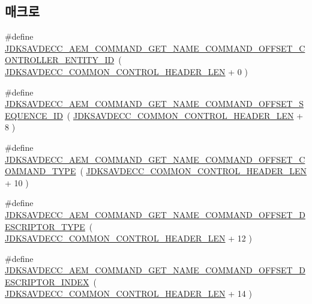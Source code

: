 \subsection*{매크로}
\begin{DoxyCompactItemize}
\item 
\#define \hyperlink{group__command__get__name_gaa35d50e1bea499d01a942ef2d31da293}{J\+D\+K\+S\+A\+V\+D\+E\+C\+C\+\_\+\+A\+E\+M\+\_\+\+C\+O\+M\+M\+A\+N\+D\+\_\+\+G\+E\+T\+\_\+\+N\+A\+M\+E\+\_\+\+C\+O\+M\+M\+A\+N\+D\+\_\+\+O\+F\+F\+S\+E\+T\+\_\+\+C\+O\+N\+T\+R\+O\+L\+L\+E\+R\+\_\+\+E\+N\+T\+I\+T\+Y\+\_\+\+ID}~( \hyperlink{group__jdksavdecc__avtp__common__control__header_gaae84052886fb1bb42f3bc5f85b741dff}{J\+D\+K\+S\+A\+V\+D\+E\+C\+C\+\_\+\+C\+O\+M\+M\+O\+N\+\_\+\+C\+O\+N\+T\+R\+O\+L\+\_\+\+H\+E\+A\+D\+E\+R\+\_\+\+L\+EN} + 0 )
\item 
\#define \hyperlink{group__command__get__name_ga0863e2410243183cd5b2e983cdcec90a}{J\+D\+K\+S\+A\+V\+D\+E\+C\+C\+\_\+\+A\+E\+M\+\_\+\+C\+O\+M\+M\+A\+N\+D\+\_\+\+G\+E\+T\+\_\+\+N\+A\+M\+E\+\_\+\+C\+O\+M\+M\+A\+N\+D\+\_\+\+O\+F\+F\+S\+E\+T\+\_\+\+S\+E\+Q\+U\+E\+N\+C\+E\+\_\+\+ID}~( \hyperlink{group__jdksavdecc__avtp__common__control__header_gaae84052886fb1bb42f3bc5f85b741dff}{J\+D\+K\+S\+A\+V\+D\+E\+C\+C\+\_\+\+C\+O\+M\+M\+O\+N\+\_\+\+C\+O\+N\+T\+R\+O\+L\+\_\+\+H\+E\+A\+D\+E\+R\+\_\+\+L\+EN} + 8 )
\item 
\#define \hyperlink{group__command__get__name_gae4df55f0f2311b271a730a3893196a86}{J\+D\+K\+S\+A\+V\+D\+E\+C\+C\+\_\+\+A\+E\+M\+\_\+\+C\+O\+M\+M\+A\+N\+D\+\_\+\+G\+E\+T\+\_\+\+N\+A\+M\+E\+\_\+\+C\+O\+M\+M\+A\+N\+D\+\_\+\+O\+F\+F\+S\+E\+T\+\_\+\+C\+O\+M\+M\+A\+N\+D\+\_\+\+T\+Y\+PE}~( \hyperlink{group__jdksavdecc__avtp__common__control__header_gaae84052886fb1bb42f3bc5f85b741dff}{J\+D\+K\+S\+A\+V\+D\+E\+C\+C\+\_\+\+C\+O\+M\+M\+O\+N\+\_\+\+C\+O\+N\+T\+R\+O\+L\+\_\+\+H\+E\+A\+D\+E\+R\+\_\+\+L\+EN} + 10 )
\item 
\#define \hyperlink{group__command__get__name_ga712329e89d6b6ca6b96759b6f9bf434b}{J\+D\+K\+S\+A\+V\+D\+E\+C\+C\+\_\+\+A\+E\+M\+\_\+\+C\+O\+M\+M\+A\+N\+D\+\_\+\+G\+E\+T\+\_\+\+N\+A\+M\+E\+\_\+\+C\+O\+M\+M\+A\+N\+D\+\_\+\+O\+F\+F\+S\+E\+T\+\_\+\+D\+E\+S\+C\+R\+I\+P\+T\+O\+R\+\_\+\+T\+Y\+PE}~( \hyperlink{group__jdksavdecc__avtp__common__control__header_gaae84052886fb1bb42f3bc5f85b741dff}{J\+D\+K\+S\+A\+V\+D\+E\+C\+C\+\_\+\+C\+O\+M\+M\+O\+N\+\_\+\+C\+O\+N\+T\+R\+O\+L\+\_\+\+H\+E\+A\+D\+E\+R\+\_\+\+L\+EN} + 12 )
\item 
\#define \hyperlink{group__command__get__name_ga4b7f9d1481ee58ed08dcd76a1d9659e6}{J\+D\+K\+S\+A\+V\+D\+E\+C\+C\+\_\+\+A\+E\+M\+\_\+\+C\+O\+M\+M\+A\+N\+D\+\_\+\+G\+E\+T\+\_\+\+N\+A\+M\+E\+\_\+\+C\+O\+M\+M\+A\+N\+D\+\_\+\+O\+F\+F\+S\+E\+T\+\_\+\+D\+E\+S\+C\+R\+I\+P\+T\+O\+R\+\_\+\+I\+N\+D\+EX}~( \hyperlink{group__jdksavdecc__avtp__common__control__header_gaae84052886fb1bb42f3bc5f85b741dff}{J\+D\+K\+S\+A\+V\+D\+E\+C\+C\+\_\+\+C\+O\+M\+M\+O\+N\+\_\+\+C\+O\+N\+T\+R\+O\+L\+\_\+\+H\+E\+A\+D\+E\+R\+\_\+\+L\+EN} + 14 )

\end{DoxyCompactItemize}
